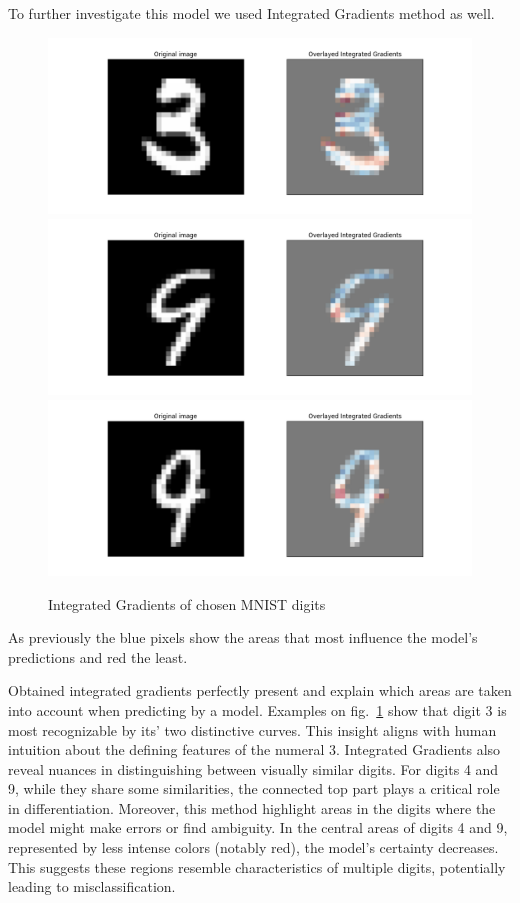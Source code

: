 \documentclass[journal, a4paper]{IEEEtran}
\begin{document}
To further investigate this model we used Integrated Gradients method as well.
\begin{figure}[h]\centering
    \includegraphics[width=.6\linewidth]{img/integrated_grad/mnist_CNN/3}
    \includegraphics[width=.6\linewidth]{img/integrated_grad/mnist_CNN/4_again2}
    \includegraphics[width=.6\linewidth]{img/integrated_grad/mnist_CNN/9}
    \caption{Integrated Gradients of chosen MNIST digits}\label{fig:mnist-cnn-integrated-grad}
\end{figure}
As previously the blue pixels show the areas that most influence the model's predictions and red the least.

Obtained integrated gradients perfectly present and explain which areas are taken into account when predicting by a model.
Examples on fig.~\ref{fig:mnist-cnn-integrated-grad} show that digit 3 is most recognizable by its' two distinctive curves.
This insight aligns with human intuition about the defining features of the numeral 3.
Integrated Gradients also reveal nuances in distinguishing between visually similar digits.
For digits 4 and 9, while they share some similarities, the connected top part plays a critical role in differentiation.
Moreover, this method highlight areas in the digits where the model might make errors or find ambiguity.
In the central areas of digits 4 and 9, represented by less intense colors (notably red), the model's certainty decreases.
This suggests these regions resemble characteristics of multiple digits, potentially leading to misclassification.
\end{document}

